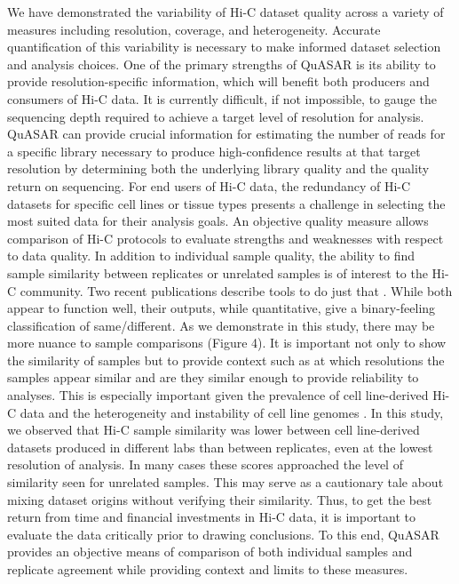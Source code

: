 We have demonstrated the variability of Hi-C dataset quality across a variety of measures including resolution, coverage, and heterogeneity. Accurate quantification of this variability is necessary to make informed dataset selection and analysis choices. One of the primary strengths of QuASAR is its ability to provide resolution-specific information, which will benefit both producers and consumers of Hi-C data. It is currently difficult, if not impossible, to gauge the sequencing depth required to achieve a target level of resolution for analysis. QuASAR can provide crucial information for estimating the number of reads for a specific library necessary to produce high-confidence results at that target resolution by determining both the underlying library quality and the quality return on sequencing. For end users of Hi-C data, the redundancy of Hi-C datasets for specific cell lines or tissue types presents a challenge in selecting the most suited data for their analysis goals. An objective quality measure allows comparison of Hi-C protocols to evaluate strengths and weaknesses with respect to data quality. In addition to individual sample quality, the ability to find sample similarity between replicates or unrelated samples is of interest to the Hi-C community. Two recent publications describe tools to do just that \cite{yang_hicrep:_2017,yan_hic-spector:_2017}. While both appear to function well, their outputs, while quantitative, give a binary-feeling classification of same/different. As we demonstrate in this study, there may be more nuance to sample comparisons (Figure 4). It is important not only to show the similarity of samples but to provide context such as at which resolutions the samples appear similar and are they similar enough to provide reliability to analyses. This is especially important given the prevalence of cell line-derived Hi-C data and the heterogeneity and instability of cell line genomes \cite{khan_heterogeneous_2017,jemaa_heterogeneity_2017}. In this study, we observed that Hi-C sample similarity was lower between cell line-derived datasets produced in different labs than between replicates, even at the lowest resolution of analysis. In many cases these scores approached the level of similarity seen for unrelated samples. This may serve as a cautionary tale about mixing dataset origins without verifying their similarity. Thus, to get the best return from time and financial investments in Hi-C data, it is important to evaluate the data critically prior to drawing conclusions. To this end, QuASAR provides an objective means of comparison of both individual samples and replicate agreement while providing context and limits to these measures.

